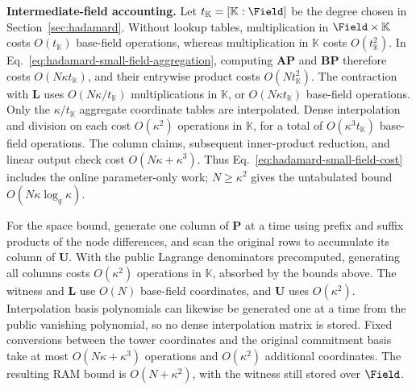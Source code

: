 \smallskip\noindent\textbf{Intermediate-field accounting.}
Let
\(t_{\mathbb K}=[\mathbb K:\Field]\) be the degree chosen in
Section~\ref{sec:hadamard}. Without lookup tables, multiplication in
\(\Field\times\mathbb K\) costs \(O(t_{\mathbb K})\)
base-field operations, whereas multiplication in \(\mathbb K\)
costs \(O(t_{\mathbb K}^2)\).
In Eq.~\eqref{eq:hadamard-small-field-aggregation}, computing
\(\bm A\bm P\) and \(\bm B\bm P\) therefore costs
\(O(N\kappa t_{\mathbb K})\), and their entrywise product costs
\(O(Nt_{\mathbb K}^2)\).
The contraction with \(\bm L\) uses
\(O(N\kappa/t_{\mathbb K})\) multiplications in \(\mathbb K\),
or \(O(N\kappa t_{\mathbb K})\) base-field operations.
Only the \(\kappa/t_{\mathbb K}\) aggregate coordinate tables
are interpolated. Dense interpolation and division on each cost
\(O(\kappa^2)\) operations in \(\mathbb K\), for a total of
\(O(\kappa^3t_{\mathbb K})\) base-field operations.
The column claims, subsequent inner-product reduction, and linear
output check cost \(O(N\kappa+\kappa^3)\).
Thus Eq.~\eqref{eq:hadamard-small-field-cost} includes the
online parameter-only work; \(N\geq\kappa^2\) gives the
untabulated bound \(O(N\kappa\log_q\kappa)\).

For the space bound, generate one column of \(\bm P\) at a time
using prefix and suffix products of the node differences, and
scan the original rows to accumulate its column of \(\bm U\).
With the public Lagrange denominators precomputed, generating all
columns costs \(O(\kappa^2)\) operations in \(\mathbb K\),
absorbed by the bounds above. The witness and \(\bm L\) use
\(O(N)\) base-field coordinates, and \(\bm U\) uses
\(O(\kappa^2)\). Interpolation basis polynomials can likewise
be generated one at a time from the public vanishing polynomial,
so no dense interpolation matrix is stored.
Fixed conversions between the tower coordinates and the original
commitment basis take at most \(O(N\kappa+\kappa^3)\) operations
and \(O(\kappa^2)\) additional coordinates.
The resulting RAM bound is \(O(N+\kappa^2)\), with the witness
still stored over \(\Field\).

